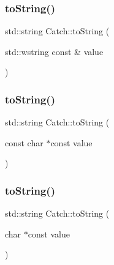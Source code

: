 \hypertarget{namespace_catch_af9fc40701e3a7d0790866e7cf8c0279f}{}\label{namespace_catch_af9fc40701e3a7d0790866e7cf8c0279f} 
\subsubsection{\texorpdfstring{to\+String()}{toString()}\hspace{0.1cm}{\footnotesize\ttfamily [3/17]}}
{\footnotesize\ttfamily std\+::string Catch\+::to\+String (\begin{DoxyParamCaption}\item[{std\+::wstring const \&}]{value }\end{DoxyParamCaption})}

\hypertarget{namespace_catch_ace2e2fe33b196bc8278f605dcb72e38d}{}\label{namespace_catch_ace2e2fe33b196bc8278f605dcb72e38d} 
\subsubsection{\texorpdfstring{to\+String()}{toString()}\hspace{0.1cm}{\footnotesize\ttfamily [4/17]}}
{\footnotesize\ttfamily std\+::string Catch\+::to\+String (\begin{DoxyParamCaption}\item[{const char $\ast$const}]{value }\end{DoxyParamCaption})}

\hypertarget{namespace_catch_ae6c2bc95517444d8df8199bd3f61609b}{}\label{namespace_catch_ae6c2bc95517444d8df8199bd3f61609b} 
\subsubsection{\texorpdfstring{to\+String()}{toString()}\hspace{0.1cm}{\footnotesize\ttfamily [5/17]}}
{\footnotesize\ttfamily std\+::string Catch\+::to\+String (\begin{DoxyParamCaption}\item[{char $\ast$const}]{value }\end{DoxyParamCaption})}

\hypertarget{namespace_catch_afa173b4639c682c9d8c20fae0939693c}{}\label{namespace_catch_afa173b4639c682c9d8c20fae0939693c} 
